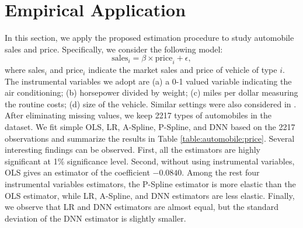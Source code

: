 \documentclass[11pt, preprint]{imsart}
\numberwithin{equation}{section}
\theoremstyle{plain}
\theoremstyle{definition}
\begin{document}
%  
%
%
%
\section{Empirical Application}\label{sec:empirical}
In this section, we apply the proposed estimation procedure to study automobile sales and price. Specifically, we consider the following model:
\begin{equation*}
	\textrm{sales}_i=\beta\times \textrm{price}_i+\epsilon,
\end{equation*}
where sales$_i$ and price$_i$ indicate the market sales and price of vehicle of type $i$. The instrumental variables we adopt are (a) a 0-1 valued variable indicating the air conditioning; (b) horsepower divided by weight; (c) miles per dollar measuring the routine costs; (d) size of the vehicle. Similar settings were also considered in \cite{blp95}. After eliminating missing values, we keep 2217 types of automobiles in the dataset. We fit simple OLS, LR, A-Spline, P-Spline, and DNN based on the 2217 observations and summarize the results in Table  \ref{table:automobile:price}. Several interesting findings can be observed. First, all the estimators are highly significant at 1\% significance level. Second, without using instrumental variables, OLS gives an estimator of the coefficient $-0.0840$. Among the rest four instrumental variables estimators, the P-Spline estimator is more elastic than the OLS estimator, while LR, A-Spline, and DNN estimators are less elastic. Finally, we observe that LR and  DNN estimators are almost equal, but the standard deviation of the DNN estimator is slightly smaller. 
\end{document}
